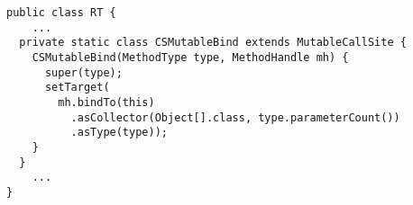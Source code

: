 {\scriptsize \begin{verbatim}
public class RT {
    ...
  private static class CSMutableBind extends MutableCallSite {
    CSMutableBind(MethodType type, MethodHandle mh) {
      super(type);
      setTarget(
        mh.bindTo(this)
          .asCollector(Object[].class, type.parameterCount())
          .asType(type));
    }
  }
    ...
}
\end{verbatim} }
